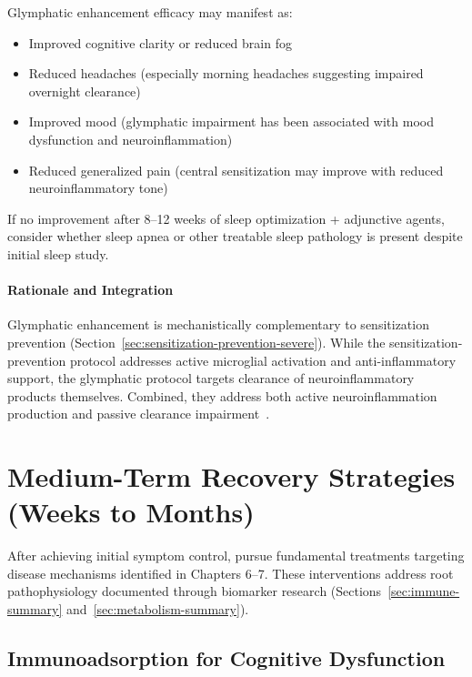 \begin{protocol}
Glymphatic enhancement efficacy may manifest as:
\begin{itemize}
    \item Improved cognitive clarity or reduced brain fog
    \item Reduced headaches (especially morning headaches suggesting impaired overnight clearance)
    \item Improved mood (glymphatic impairment has been associated with mood dysfunction and neuroinflammation)
    \item Reduced generalized pain (central sensitization may improve with reduced neuroinflammatory tone)
\end{itemize}

If no improvement after 8--12 weeks of sleep optimization + adjunctive agents, consider whether sleep apnea or other treatable sleep pathology is present despite initial sleep study.

\paragraph{Rationale and Integration}

Glymphatic enhancement is mechanistically complementary to sensitization prevention (Section~\ref{sec:sensitization-prevention-severe}). While the sensitization-prevention protocol addresses active microglial activation and anti-inflammatory support, the glymphatic protocol targets clearance of neuroinflammatory products themselves. Combined, they address both active neuroinflammation production and passive clearance impairment~\cite{MCMC2024Neurometabolic}.

\end{protocol}

\section{Medium-Term Recovery Strategies (Weeks to Months)}
\label{sec:medium-term-recovery}

After achieving initial symptom control, pursue fundamental treatments targeting disease mechanisms identified in Chapters 6--7. These interventions address root pathophysiology documented through biomarker research (Sections~\ref{sec:immune-summary} and~\ref{sec:metabolism-summary}).

\subsection{Immunoadsorption for Cognitive Dysfunction}
\label{sec:immunoadsorption}

